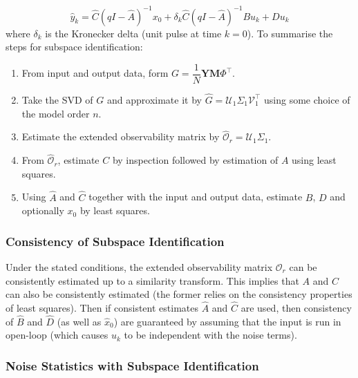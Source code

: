 \documentclass[11pt]{report} %
\begin{document}
\begin{equation}
\widehat{y}_{k} = \widehat{C}\left(qI - \widehat{A}\right)^{-1}x_{0} + \delta_{k} \widehat{C}\left(qI - \widehat{A}\right)^{-1}Bu_{k} + Du_{k}
\end{equation}
where $\delta_{k}$ is the Kronecker delta (unit pulse at time $k = 0$). To summarise the steps for subspace identification:
\begin{enumerate}
\item From input and output data, form $G = \dfrac{1}{N}\mathbf{Y}\mathbf{M}\Phi^{\top}$.
\item Take the SVD of $G$ and approximate it by $\widehat{G} = \mathcal{U}_{1}\Sigma_{1}\mathcal{V}_{1}^{\top}$ using some choice of the model order $n$.
\item Estimate the extended observability matrix by $\widehat{\mathcal{O}}_{r} = \mathcal{U}_{1}\Sigma_{1}$.
\item From $\widehat{\mathcal{O}}_{r}$, estimate $C$ by inspection followed by estimation of $A$ using least squares.
\item Using $\widehat{A}$ and $\widehat{C}$ together with the input and output data, estimate $B$, $D$ and optionally $x_{0}$ by least squares.
\end{enumerate}

\subsubsection{Consistency of Subspace Identification}

Under the stated conditions, the extended observability matrix $\mathcal{O}_{r}$ can be consistently estimated up to a similarity transform. This implies that $A$ and $C$ can also be consistently estimated (the former relies on the consistency properties of least squares). Then if consistent estimates $\widehat{A}$ and $\widehat{C}$ are used, then consistency of $\widehat{B}$ and $\widehat{D}$ (as well as $\widehat{x}_{0}$) are guaranteed by assuming that the input is run in open-loop (which causes $u_{k}$ to be independent with the noise terms).

\subsubsection{Noise Statistics with Subspace Identification}
\end{document}
